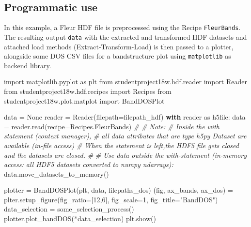 \documentclass[]{article}
\newenvironment{Shaded}{}{}
\newcommand{\DecValTok}[1]{\textcolor[rgb]{0.25,0.63,0.44}{#1}}
\newcommand{\StringTok}[1]{\textcolor[rgb]{0.25,0.44,0.63}{#1}}
\newcommand{\ImportTok}[1]{#1}
\newcommand{\CommentTok}[1]{\textcolor[rgb]{0.38,0.63,0.69}{\textit{#1}}}
\newcommand{\VariableTok}[1]{\textcolor[rgb]{0.10,0.09,0.49}{#1}}
\newcommand{\ControlFlowTok}[1]{\textcolor[rgb]{0.00,0.44,0.13}{\textbf{#1}}}
\newcommand{\OperatorTok}[1]{\textcolor[rgb]{0.40,0.40,0.40}{#1}}
\newcommand{\NormalTok}[1]{#1}
\begin{document}
\subsection{Programmatic use}\label{programmatic-use}

In this example, a Fleur HDF file is preprocessed using the Recipe
\texttt{FleurBands}. The resulting output \texttt{data} with the
extracted and transformed HDF datasets and attached load methods
(Extract-Transform-Load) is then passed to a plotter, alongside some DOS
CSV files for a bandstructure plot using \texttt{matplotlib} as backend
library.

\begin{Shaded}
\begin{Highlighting}[]
\ImportTok{import}\NormalTok{ matplotlib.pyplot }\ImportTok{as}\NormalTok{ plt}
\ImportTok{from}\NormalTok{ studentproject18w.hdf.reader }\ImportTok{import}\NormalTok{ Reader}
\ImportTok{from}\NormalTok{ studentproject18w.hdf.recipes }\ImportTok{import}\NormalTok{ Recipes}
\ImportTok{from}\NormalTok{ studentproject18w.plot.matplot }\ImportTok{import}\NormalTok{ BandDOSPlot}

\NormalTok{data }\OperatorTok{=} \VariableTok{None}
\NormalTok{reader }\OperatorTok{=}\NormalTok{ Reader(filepath}\OperatorTok{=}\NormalTok{filepath_hdf)}
\ControlFlowTok{with}\NormalTok{ reader }\ImportTok{as}\NormalTok{ h5file:}
\NormalTok{    data }\OperatorTok{=}\NormalTok{ reader.read(recipe}\OperatorTok{=}\NormalTok{Recipes.FleurBands)}
    \CommentTok{#}
    \CommentTok{# Note:}
    \CommentTok{# Inside the with statement (context manager),}
    \CommentTok{# all data attributes that are type h5py Dataset are available (in-file access)}
    \CommentTok{# When the statement is left,the HDF5 file gets closed and the datasets are closed.}
    \CommentTok{#}
    \CommentTok{# Use data outside the with-statement (in-memory access: all HDF5 datasets converted to numpy ndarrays):}
\NormalTok{    data.move_datasets_to_memory()}

\NormalTok{plotter }\OperatorTok{=}\NormalTok{ BandDOSPlot(plt, data, filepaths_dos)}
\NormalTok{(fig, ax_bands, ax_dos) }\OperatorTok{=}\NormalTok{ plter.setup_figure(fig_ratio}\OperatorTok{=}\NormalTok{[}\DecValTok{12}\NormalTok{,}\DecValTok{6}\NormalTok{], fig_scale}\OperatorTok{=}\DecValTok{1}\NormalTok{, fig_title}\OperatorTok{=}\StringTok{"BandDOS"}\NormalTok{)}
\NormalTok{data_selection }\OperatorTok{=}\NormalTok{ some_selection_process()}
\NormalTok{plotter.plot_bandDOS(}\OperatorTok{*}\NormalTok{data_selection)}
\NormalTok{plt.show()}
\end{Highlighting}
\end{Shaded}
\end{document}
